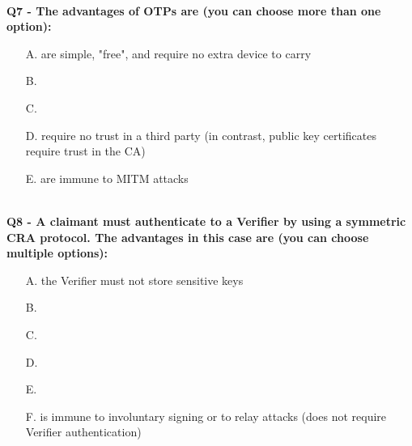 \textbf{\\Q7 - The advantages of OTPs are (you can choose more than one option):}
\begin{enumerate}
    \item[A.] are simple, "free", and require no extra device to carry
    \item[B.] 
    \item[C.] 
    \item[D.] require no trust in a third party (in contrast, public key certificates require trust in the CA) 
    \item[E.] are immune to MITM attacks
\end{enumerate}

\textbf{\\Q8 - A claimant must authenticate to a Verifier by using a symmetric CRA protocol. The advantages in this case are (you can choose multiple options):}
\begin{enumerate}
    \item[A.] the Verifier must not store sensitive keys
    \item[B.] 
    \item[C.] 
    \item[D.] 
    \item[E.] 
    \item[F.] is immune to involuntary signing or to relay attacks (does not require Verifier authentication)
\end{enumerate}

